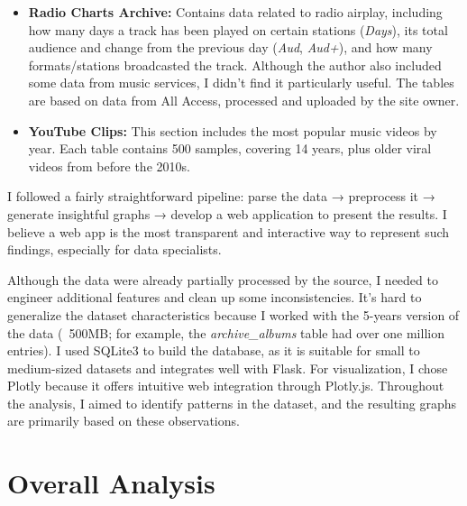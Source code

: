 \documentclass{article}
\begin{document}
\begin{itemize}
    \item \textbf{Radio Charts Archive:}  
    Contains data related to radio airplay, including how many days a track has been played on certain stations (\textit{Days}), its total audience and change from the previous day (\textit{Aud}, \textit{Aud+}), and how many formats/stations broadcasted the track. Although the author also included some data from music services, I didn’t find it particularly useful. The tables are based on data from All Access, processed and uploaded by the site owner.

    \item \textbf{YouTube Clips:}  
    This section includes the most popular music videos by year. Each table contains 500 samples, covering 14 years, plus older viral videos from before the 2010s.
\end{itemize}

\bigskip

I followed a fairly straightforward pipeline: parse the data → preprocess it → generate insightful graphs → develop a web application to present the results. I believe a web app is the most transparent and interactive way to represent such findings, especially for data specialists.

\smallskip

Although the data were already partially processed by the source, I needed to engineer additional features and clean up some inconsistencies. It’s hard to generalize the dataset characteristics because I worked with the 5-years version of the data (~500MB; for example, the \textit{archive\_albums} table had over one million entries). I used SQLite3 to build the database, as it is suitable for small to medium-sized datasets and integrates well with Flask. For visualization, I chose Plotly because it offers intuitive web integration through Plotly.js. Throughout the analysis, I aimed to identify patterns in the dataset, and the resulting graphs are primarily based on these observations.\\

\clearpage

\section*{Overall Analysis}
\end{document}

